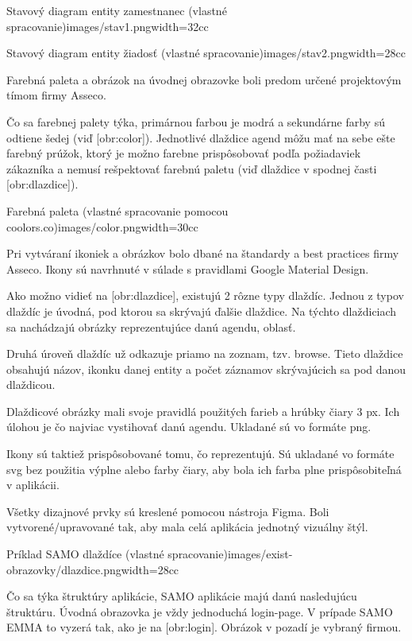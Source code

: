 {Stavový diagram entity zamestnanec (vlastné spracovanie)}{images/stav1.png}{width=32cc} 


{Stavový diagram entity žiadosť (vlastné spracovanie)}{images/stav2.png}{width=28cc} 


\zlom
{}
Farebná paleta a obrázok na úvodnej obrazovke boli predom určené projektovým tímom firmy Asseco.

Čo sa farebnej palety týka, primárnou farbou je modrá a sekundárne farby sú odtiene šedej (viď [obr:color]). Jednotlivé dlaždice agend môžu mať na sebe ešte farebný prúžok, ktorý je možno farebne prispôsobovať podľa požiadaviek zákazníka a nemusí rešpektovať farebnú paletu (viď dlaždice v spodnej časti [obr:dlazdice]).

{Farebná paleta (vlastné spracovanie pomocou coolors.co)}{images/color.png}{width=30cc} 

Pri vytváraní ikoniek a obrázkov bolo dbané na štandardy a best practices firmy Asseco. Ikony sú navrhnuté v súlade s pravidlami Google Material Design. 

Ako možno vidieť na [obr:dlazdice], existujú 2 rôzne typy dlaždíc. Jednou z typov dlaždíc je úvodná, pod ktorou sa skrývajú ďalšie dlaždice. Na týchto dlaždiciach sa nachádzajú obrázky reprezentujúce danú agendu, oblasť. 

Druhá úroveň dlaždíc už odkazuje priamo na zoznam, tzv. browse. Tieto dlaždice obsahujú názov, ikonku danej entity a počet záznamov skrývajúcich sa pod danou dlaždicou. 

Dlaždicové obrázky mali svoje pravidlá použitých farieb a hrúbky čiary 3 px. Ich úlohou je čo najviac vystihovať danú agendu. Ukladané sú vo formáte png. 

Ikony sú taktiež prispôsobované tomu, čo reprezentujú. Sú ukladané vo formáte svg bez použitia výplne alebo farby čiary, aby bola ich farba plne prispôsobiteľná v aplikácii.

Všetky dizajnové prvky sú kreslené pomocou nástroja Figma. Boli vytvorené/upravované tak, aby mala celá aplikácia jednotný vizuálny štýl. 

{Príklad SAMO dlaždíce (vlastné spracovanie)}{images/exist-obrazovky/dlazdice.png}{width=28cc} 

Čo sa týka štruktúry aplikácie, SAMO aplikácie majú danú nasledujúcu štruktúru.  Úvodná obrazovka je vždy jednoduchá login-page. V prípade SAMO EMMA to vyzerá tak, ako je na [obr:login]. Obrázok v pozadí je vybraný firmou.

